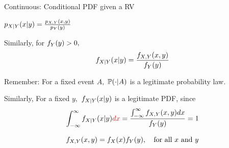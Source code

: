 \begin{frame}{Continuous:  Conditional PDF given a RV}

{
\medskip
\small
\plitemsep 0.1in
\bci

\item $p_{X|Y}(x|y) = \frac{p_{X,Y}(x,y)}{p_Y(y)}$

\item<2-> Similarly, for $f_Y(y) >0,$
$$
f_{X|Y}(x|y) = \frac{f_{X,Y}(x,y)}{f_Y(y)}
$$

\item<3-> Remember: For a fixed event $A,$ $\mathbb{P}( \cdot | A )$ is a legitimate probability law.

\item<4-> Similarly, For a fixed $y,$ $f_{X|Y}(x|y)$ is a legitimate PDF, since
$$
\int_{-\infty}^\infty f_{X|Y}(x|y) {\color{red} dx} = \frac{\int_{-\infty}^\infty f_{X,Y}(x,y) dx}{f_Y(y)} = 1
$$
\eci
}
{
\medskip
\small
\plitemsep 0.01in
\bci

\item<5-> 
\aleq{
\fxy &= \fy \cdot \fxcy \cr
&= \fx \fycx
}

\item<6-> 

\item<7-> 
$$
f_{X,Y}(x,y) = f_X(x) f_Y(y), \quad \text{for all $x$ and $y$}
$$
\eci
}
\end{frame}

